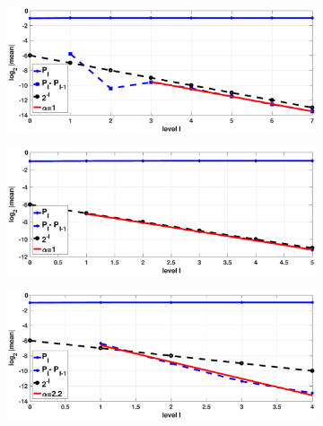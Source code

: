 \FloatBarrier
\begin{figure}[htb]
	\centering %
	\begin{subfigure}{0.5\textwidth}
		\includegraphics[width=\linewidth]{./figures/MLMC_binary_Heston_opt/without_smoothing/digital_option_set1_L_0_1_steps_L_6_2_N_10_7/digital_option_set1_L_0_1_steps_L_6_2_N_10_7_weak}
		\caption{}
		\label{fig:weak_rate_hest_digital_non_smoothing_FT}
	\end{subfigure}\hfil %
	\begin{subfigure}{0.5\textwidth}
		\includegraphics[width=\linewidth]{./figures/MLMC_binary_Heston_opt/with_smoothing/OU/digital_option_set1_L_0_2_steps_L_5_N_10_7_beta_128/digital_option_set1_L_0_2_steps_L_5_N_10_7_weak}
		\caption{}
		\label{fig:weak_rate_hest_digital_smoothing_OU}
	\end{subfigure}\hfil %
	\begin{subfigure}{0.5\textwidth}
		\includegraphics[width=\linewidth]{./figures/MLMC_binary_Heston_opt/with_smoothing/FT/digital_option_set1_L_0_2_steps_L_4_N_10_7_beta_32/digital_option_set1_L_0_2_steps_L_4_N_10_7_weak}

\end{subfigure}
\end{figure}
